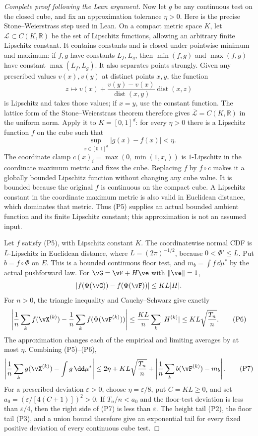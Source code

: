 \begin{proof}[Complete proof following the Lean argument]
Now let $g$ be any continuous test on the closed cube, and fix an
approximation tolerance $\eta>0$.
Here is the precise Stone--Weierstrass step used in Lean. On a compact
metric space $K$, let $\mathcal L\subset C(K,\mathbb R)$ be the set of
Lipschitz functions, allowing an arbitrary finite Lipschitz constant.
It contains constants and is closed under pointwise minimum and maximum:
if $f,g$ have constants $L_f,L_g$, then $\min(f,g)$ and $\max(f,g)$ have
constant $\max(L_f,L_g)$.
It also separates points strongly. Given any prescribed values $v(x),v(y)$
at distinct points $x,y$, the function
\[
 z\longmapsto v(x)+\frac{v(y)-v(x)}{\operatorname{dist}(x,y)}
                                  \operatorname{dist}(x,z)
                                                        \tag{P4}
\]
is Lipschitz and takes those values; if $x=y$, use the constant function.
The lattice form of the Stone--Weierstrass theorem therefore gives
$\overline{\mathcal L}=C(K,\mathbb R)$ in the uniform norm.
Apply it to $K=[0,1]^d$: for every $\eta>0$ there is a Lipschitz function
$f$ on the cube such that
\[
                 \sup_{x\in[0,1]^d}|g(x)-f(x)|<\eta.       \tag{P5}
\]
The coordinate clamp $c(x)_i=\max(0,\min(1,x_i))$ is $1$-Lipschitz
in the coordinate maximum metric and fixes the cube. Replacing $f$ by
$f\circ c$ makes it a globally bounded Lipschitz function without
changing any cube value. It is bounded because the original $f$ is
continuous on the compact cube. A Lipschitz constant in the coordinate
maximum metric is also valid in Euclidean distance, which dominates that
metric. Thus (P5) supplies an actual bounded ambient function and its
finite Lipschitz constant; this approximation is not an assumed input.

Let $f$ satisfy (P5), with Lipschitz constant $K$.
The coordinatewise normal CDF is $L$-Lipschitz in Euclidean distance,
where $L=(2\pi)^{-1/2}$, because $0<\Phi'\le L$.
Put $b=f\circ\Phi$ on $E$. This is a bounded continuous floor test,
and $m_b=\int f\,\dd\mu^\ast$ by the actual pushforward law.
For $\vG=\vF+H\ve$ with $\|\ve\|=1$,
\[
 |f(\Phi(\vG))-f(\Phi(\vF))|\le KL|H|.
\]
For $n>0$, the triangle inequality and Cauchy--Schwarz give exactly
\[
 \left|\frac1n\sum_k f(\vX^{(k)})
       -\frac1n\sum_k f(\Phi(\vF^{(k)}))\right|
 \le\frac{KL}{n}\sum_k|H^{(k)}|
 \le KL\sqrt{\frac{T_n}{n}}.                 \tag{P6}
\]
The approximation changes each of the empirical and limiting averages
by at most $\eta$. Combining (P5)--(P6),
\[
 \left|\frac1n\sum_k g(\vX^{(k)})-\int g\,\dd\mu^\ast\right|
 \le2\eta+KL\sqrt{\frac{T_n}{n}}
       +\left|\frac1n\sum_k b(\vF^{(k)})-m_b\right|. \tag{P7}
\]
For a prescribed deviation $\varepsilon>0$, choose
$\eta=\varepsilon/8$, put $C=KL\ge0$, and set
$a_0=(\varepsilon/[4(C+1)])^2>0$.
If $T_n/n<a_0$ and the floor-test deviation is less than
$\varepsilon/4$, then the right side of (P7) is less than
$\varepsilon$. The height tail (P2), the floor tail (P3), and a union
bound therefore give an exponential tail for every fixed positive
deviation of every continuous cube test.


\end{proof}
